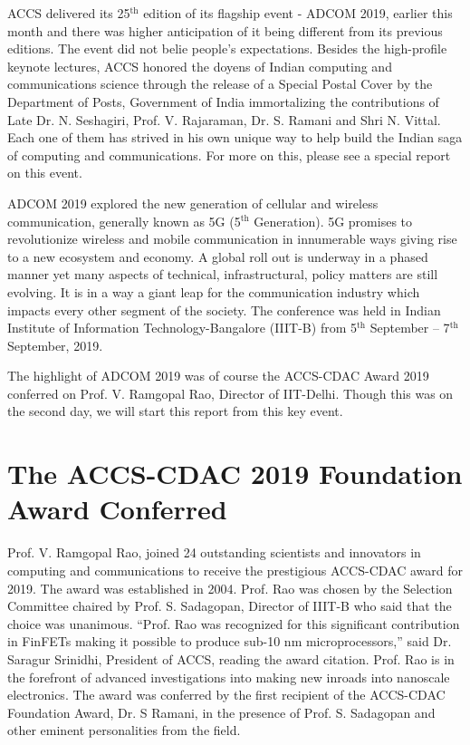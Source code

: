 \begin{multicols}{2}
ACCS delivered its 25$^{\text{th}}$ edition of its flagship event - ADCOM 2019, earlier this month and there was higher anticipation of it being different from its previous editions. The event did not belie people’s expectations. Besides the high-profile keynote lectures, ACCS honored the doyens of Indian computing and communications science through the release of a Special Postal Cover by the Department of Posts, Government of India immortalizing the contributions of Late Dr. N. Seshagiri, Prof. V. Rajaraman, Dr. S. Ramani and Shri N. Vittal. Each one of them has strived in his own unique way to help build the Indian saga of computing and communications. For more on this, please see a special report on this event.

ADCOM 2019 explored the new generation of cellular and wireless communication, generally known as 5G (5$^{\text{th}}$ Generation). 5G promises to revolutionize wireless and mobile communication in innumerable ways giving rise to a new ecosystem and economy. A global roll out is underway in a phased manner yet many aspects of technical, infrastructural, policy matters are still evolving. It is in a way a giant leap for the communication industry which impacts every other segment of the society. The conference was held in Indian Institute of Information Technology-Bangalore (IIIT-B) from 5$^{\text{th}}$ September – 7$^{\text{th}}$ September, 2019. 

The highlight of ADCOM 2019 was of course the ACCS-CDAC Award 2019 conferred on Prof. V. Ramgopal Rao, Director of IIT-Delhi. Though this was on the second day, we will start this report from this key event.

\section*{The ACCS-CDAC 2019 Foundation Award Conferred}

Prof. V. Ramgopal Rao, joined 24 outstanding scientists and innovators in computing and communications to receive the prestigious ACCS-CDAC award for 2019. The award was established in 2004. Prof. Rao was chosen by the Selection Committee chaired by Prof. S. Sadagopan, Director of IIIT-B who said that the choice was unanimous. “Prof. Rao was recognized for this significant contribution in FinFETs making it possible to produce sub-10 nm microprocessors,” said Dr. Saragur Srinidhi, President of ACCS, reading the award citation. Prof. Rao is in the forefront of advanced investigations into making new inroads into nanoscale electronics. The award was conferred by the first recipient of the ACCS-CDAC Foundation Award, Dr. S Ramani, in the presence of Prof. S. Sadagopan and other eminent personalities from the field. 


\end{multicols}
